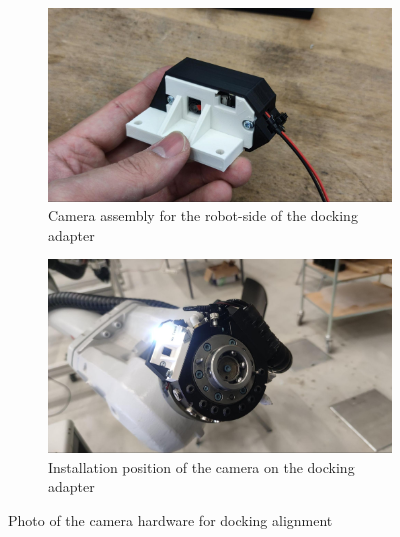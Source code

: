 \begin{figure}[!h]
    \centering
    \begin{subfigure}[b]{0.49\textwidth}
        \centering
        \includegraphics[width=\textwidth]{images/7a/img73.jpg}
        \caption{Camera assembly for the robot-side of the docking adapter}
        \label{fig:camera-assembly-hardware}
    \end{subfigure}
    \hfill
    \begin{subfigure}[b]{0.49\textwidth}
        \centering
        \includegraphics[width=\textwidth]{images/7a/img74.jpg}
        \caption{Installation position of the camera on the docking adapter}
        \label{fig:camera-installation-position-on-docking-adapter}
    \end{subfigure}
    \caption{Photo of the camera hardware for docking alignment}
\end{figure}

